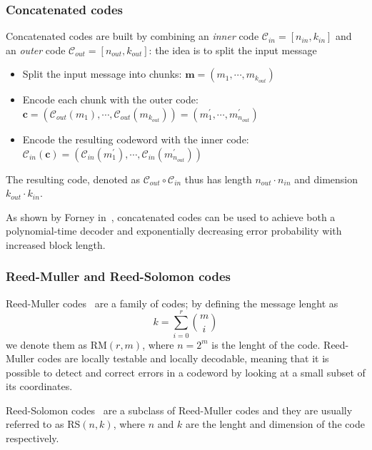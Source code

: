 \subsubsection{Concatenated codes}
    Concatenated codes are built by combining an \textit{inner} code $\mathcal{C}_{in} = [n_{in}, k_{in}]$ and an
    \textit{outer} code $\mathcal{C}_{out} = [n_{out}, k_{out}]$: the idea is to split the input message
    \begin{itemize}
        \item Split the input message into chunks: $\mathbf{m} = (m_1, \cdots, m_{k_{out}})$
        \item Encode each chunk with the outer code: $\mathbf{c} = (\mathcal{C}_{out}(m_1), \cdots, \mathcal{C}_{out}(m_{k_{out}})) = (m_1^\prime, \cdots, m_{n_{out}}^\prime)$
        \item Encode the resulting codeword with the inner code: $\mathcal{C}_{in}(\mathbf{c}) = (\mathcal{C}_{in}(m_1^\prime), \cdots, \mathcal{C}_{in}(m_{n_{out}}^\prime))$
    \end{itemize}
    The resulting code, denoted as $\mathcal{C}_{out} \circ \mathcal{C}_{in}$ thus has length $n_{out} \cdot n_{in}$ and dimension
    $k_{out} \cdot k_{in}$.

    As shown by Forney in~\cite{forney1965concatenated}, concatenated codes can be used to achieve both a 
    polynomial-time decoder and exponentially decreasing error probability with increased block length.

\subsubsection{Reed-Muller and Reed-Solomon codes}
    Reed-Muller codes~\cite{DBLP:journals/tit/Reed54,DBLP:journals/tc/Muller54} are a family of codes; by defining the message lenght as
    \begin{equation*}
        k = \sum_{i=0}^r \binom{m}{i}
    \end{equation*}
    we denote them as \textsf{RM}$(r, m)$, where $n = 2^m$ is the lenght of the code.
    Reed-Muller codes are locally testable and locally decodable, meaning that it is possible to
    detect and correct errors in a codeword by looking at a small subset of its coordinates.

    Reed-Solomon codes~\cite{reed1960polynomial} are a subclass of Reed-Muller codes and they are usually 
    referred to as \textsf{RS}$(n, k)$, where $n$ and $k$ are the lenght and dimension of the code respectively.

